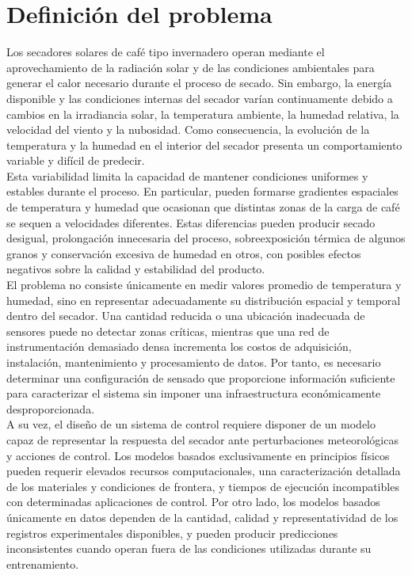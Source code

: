 \section{Definición del problema}
Los secadores solares de café tipo invernadero operan mediante el aprovechamiento de la radiación solar y de las condiciones ambientales para generar el calor necesario durante el proceso de secado. Sin embargo, la energía disponible y las condiciones internas del secador varían continuamente debido a cambios en la irradiancia solar, la temperatura ambiente, la humedad relativa, la velocidad del viento y la nubosidad. Como consecuencia, la evolución de la temperatura y la humedad en el interior del secador presenta un comportamiento variable y difícil de predecir.\\

Esta variabilidad limita la capacidad de mantener condiciones uniformes y estables durante el proceso. En particular, pueden formarse gradientes espaciales de temperatura y humedad que ocasionan que distintas zonas de la carga de café se sequen a velocidades diferentes. Estas diferencias pueden producir secado desigual, prolongación innecesaria del proceso, sobreexposición térmica de algunos granos y conservación excesiva de humedad en otros, con posibles efectos negativos sobre la calidad y estabilidad del producto.\\

El problema no consiste únicamente en medir valores promedio de temperatura y humedad, sino en representar adecuadamente su distribución espacial y temporal dentro del secador. Una cantidad reducida o una ubicación inadecuada de sensores puede no detectar zonas críticas, mientras que una red de instrumentación demasiado densa incrementa los costos de adquisición, instalación, mantenimiento y procesamiento de datos. Por tanto, es necesario determinar una configuración de sensado que proporcione información suficiente para caracterizar el sistema sin imponer una infraestructura económicamente desproporcionada.\\

A su vez, el diseño de un sistema de control requiere disponer de un modelo capaz de representar la respuesta del secador ante perturbaciones meteorológicas y acciones de control. Los modelos basados exclusivamente en principios físicos pueden requerir elevados recursos computacionales, una caracterización detallada de los materiales y condiciones de frontera, y tiempos de ejecución incompatibles con determinadas aplicaciones de control. Por otro lado, los modelos basados únicamente en datos dependen de la cantidad, calidad y representatividad de los registros experimentales disponibles, y pueden producir predicciones inconsistentes cuando operan fuera de las condiciones utilizadas durante su entrenamiento.\\

